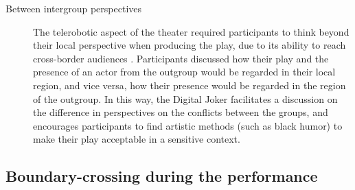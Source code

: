\documentclass[dissertation,math,vertlayout,pdfa,colorlinks]{aaltoseries}
\begin{document}
\begin{description}
   \item[Between intergroup perspectives] The telerobotic aspect of the theater required participants to think beyond their local perspective when producing the play, due to its ability to reach cross-border audiences \cite[p. 15]{peledTeleroboticTheaterOppressed2025}. Participants discussed how their play and the presence of an actor from the outgroup would be regarded in their local region, and vice versa, how their presence would be regarded in the region of the outgroup. In this way, the Digital Joker facilitates a discussion on the difference in perspectives on the conflicts between the groups, and encourages participants to find artistic methods (such as black humor) to make their play acceptable in a sensitive context.
\end{description}
\subsection{Boundary-crossing during the performance}
\end{document}
